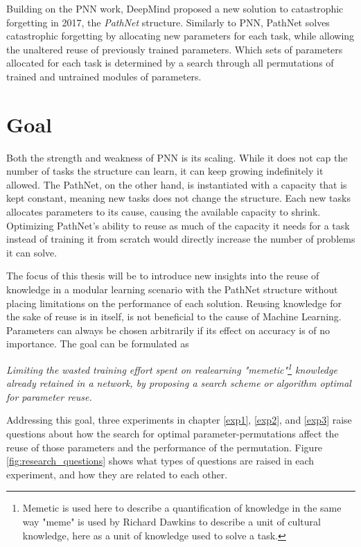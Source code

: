 Building on the PNN work, DeepMind proposed a new solution to catastrophic forgetting in 2017, the \emph{PathNet} structure\cite{pathnet}. Similarly to PNN, PathNet solves catastrophic forgetting by allocating new parameters for each task, while allowing the unaltered reuse of previously trained parameters. Which sets of parameters allocated for each task is determined by a search through all permutations of trained and untrained modules of parameters.

\section{Goal}
Both the strength and weakness of PNN is its scaling. While it does not cap the number of tasks the structure can learn, it can keep growing indefinitely it allowed. The PathNet, on the other hand, is instantiated with a capacity that is kept constant, meaning new tasks does not change the structure. Each new tasks allocates parameters to its cause, causing the available capacity to shrink. Optimizing PathNet's ability to reuse as much of the capacity it needs for a task instead of training it from scratch would directly increase the number of problems it can solve. 

The focus of this thesis will be to introduce new insights into the reuse of knowledge in a modular learning scenario with the PathNet structure\cite{pathnet} without placing limitations on the performance of each solution. Reusing knowledge for the sake of reuse is in itself, is not beneficial to the cause of Machine Learning. Parameters can always be chosen arbitrarily if its effect on accuracy is of no importance. The goal can be formulated as 

\begin{center}
    \emph{Limiting the wasted training effort spent on realearning "memetic"\footnote{Memetic is used here to describe a quantification of knowledge in the same way "meme" is used by Richard Dawkins\cite{selfishGene} to describe a unit of cultural knowledge, here as a unit of knowledge used to solve a task.} knowledge already retained in a network, by proposing a search scheme or algorithm optimal for parameter reuse.} 
\end{center}
\noindent
Addressing this goal, three experiments in chapter \ref{exp1}, \ref{exp2}, and \ref{exp3} raise questions about how the search for optimal parameter-permutations affect the reuse of those parameters and the performance of the permutation. Figure \ref{fig:research_questions} shows what types of questions are raised in each experiment, and how they are related to each other. 

